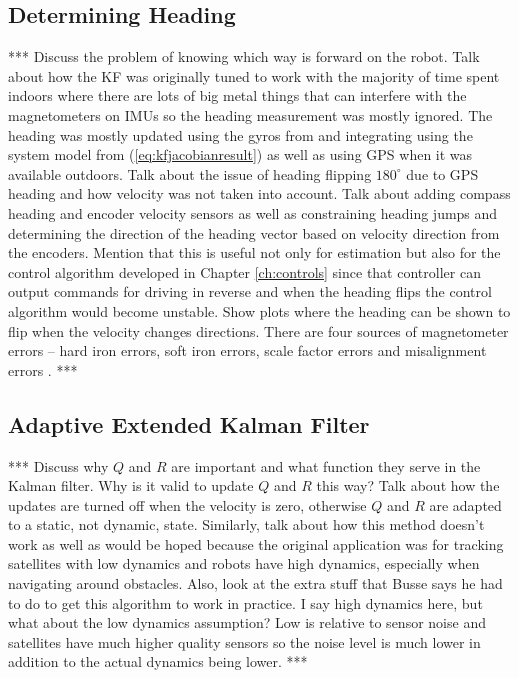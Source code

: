 \subsection{Determining Heading}
\label{sec:determineHeading}
*** Discuss the problem of knowing which way is forward on the robot. Talk about how the KF was originally tuned to work with the majority of time spent indoors where there are lots of big metal things that can interfere with the magnetometers on IMUs so the heading measurement was mostly ignored. The heading was mostly updated using the gyros from and integrating using the system model from (\ref{eq:kfjacobianresult}) as well as using GPS when it was available outdoors. Talk about the issue of heading flipping $180^\circ$ due to GPS heading and how velocity was not taken into account. Talk about adding compass heading and encoder velocity sensors as well as constraining heading jumps and determining the direction of the heading vector based on velocity direction from the encoders. Mention that this is useful not only for estimation but also for the control algorithm developed in Chapter \ref{ch:controls} since that controller can output commands for driving in reverse and when the heading flips the control algorithm would become unstable. Show plots where the heading can be shown to flip when the velocity changes directions. There are four sources of magnetometer errors -- hard iron errors, soft iron errors, scale factor errors and misalignment errors \cite{ParkinsonHeadingEstimation01}. ***

\subsection{Adaptive Extended Kalman Filter}
\label{sec:adaptiveekf}
*** Discuss why $Q$ and $R$ are important and what function they serve in the Kalman filter. Why is it valid to update $Q$ and $R$ this way? Talk about how the updates are turned off when the velocity is zero, otherwise $Q$ and $R$ are adapted to a static, not dynamic, state. Similarly, talk about how this method doesn't work as well as would be hoped because the original application was for tracking satellites with low dynamics and robots have high dynamics, especially when navigating around obstacles. Also, look at the extra stuff that Busse says he had to do to get this algorithm to work in practice. I say high dynamics here, but what about the low dynamics assumption? Low is relative to sensor noise and satellites have much higher quality sensors so the noise level is much lower in addition to the actual dynamics being lower. ***

